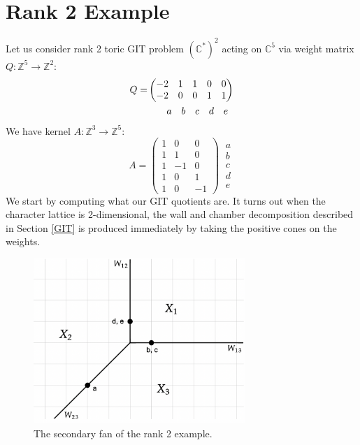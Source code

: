\documentclass[oneside,reqno]{amsart}
\theoremstyle{definition}
\theoremstyle{definition}
\theoremstyle{definition}
\theoremstyle{definition}
\newcommand{\CC}{\mathbb{C}}
\newcommand{\Z}{\mathbb{Z}}
\begin{document}
\section{Rank 2 Example}  
\label{rank2example}
Let us consider rank 2 toric GIT problem $(\CC^*)^2$ acting on $\CC^5$ via weight matrix $Q : \Z^5 \to \Z^2$:
\begin{align*}
    Q =& \begin{pmatrix}
    -2 & 1 & 1 & 0 & 0 \\
    -2 & 0 & 0 & 1 & 1
    \end{pmatrix} 
    \\
    & \hspace{0.7cm}\begin{matrix}
    a & b & c & d & e 
    \end{matrix}
\end{align*}
We have kernel $A : \Z^3 \to \Z^5$:
\begin{equation*}
    A = 
    \begin{pmatrix}
    1 & 0 & 0 \\
    1 & 1 & 0 \\
    1 & -1 & 0 \\
    1 & 0 & 1 \\
    1 & 0 & -1
    \end{pmatrix}
    \:
    \begin{matrix}
    a \\
    b \\
    c \\
    d\\
    e
    \end{matrix}
\end{equation*}
We start by computing what our GIT quotients are. It turns out when the character lattice is 2-dimensional, the wall and chamber decomposition described in Section \ref{GIT} is produced immediately by taking the positive cones on the weights. 
\begin{figure}[!h]
    \centering
    \includegraphics[width=8cm]{rank2exmp/secondaryfan1.png}
    \caption{The secondary fan of the rank 2 example.}
    \label{secondaryrank2}
\end{figure}\\
\end{document}
